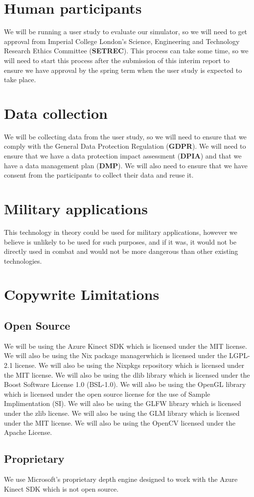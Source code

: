 \section{Human participants}
We will be running a user study to evaluate our simulator, so we will need to get approval from Imperial College London's Science, Engineering and Technology Research Ethics Committee (\textbf{SETREC}). This process can take some time, so we will need to start this process after the submission of this interim report to ensure we have approval by the spring term when the user study is expected to take place. 

\section{Data collection}
We will be collecting data from the user study, so we will need to ensure that we comply with the General Data Protection Regulation (\textbf{GDPR}). We will need to ensure that we have a data protection impact assessment (\textbf{DPIA}) and that we have a data management plan (\textbf{DMP}). We will also need to ensure that we have consent from the participants to collect their data and reuse it.

\section{Military applications}
This technology in theory could be used for military applications, however we believe is unlikely to be used for such purposes, and if it was, it would not be directly used in combat and would not be more dangerous than other existing technologies.

\section{Copywrite Limitations}
\subsection{Open Source}
We will be using the Azure Kinect SDK which is licensed under the MIT license. We will also be using the Nix package managerwhich is licensed under the LGPL-2.1 license. We will also be using the Nixpkgs repository which is licensed under the MIT license. We will also be using the dlib library which is licensed under the Boost Software License 1.0 (BSL-1.0). We will also be using the OpenGL library which is licensed under the open source license for the use of Sample Implimentation (SI). We will also be using the GLFW library which is licensed under the zlib license. We will also be using the GLM library which is licensed under the MIT license. We will also be using the OpenCV licensed under the Apache License. 
\subsection{Proprietary}
We use Microsoft's proprietary depth engine designed to work with the Azure Kinect SDK which is not open source.